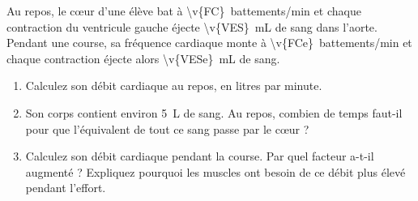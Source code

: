 Au repos, le cœur d'une élève bat à \qty{\v{FC}}{battements/min} et chaque contraction du ventricule gauche éjecte \qty{\v{VES}}{mL} de sang dans l'aorte. Pendant une course, sa fréquence cardiaque monte à \qty{\v{FCe}}{battements/min} et chaque contraction éjecte alors \qty{\v{VESe}}{mL} de sang.

\begin{enumerate}[label=\alph*)]
    \item Calculez son débit cardiaque au repos, en litres par minute.
    \item Son corps contient environ \qty{5}{L} de sang. Au repos, combien de temps faut-il pour que l'équivalent de tout ce sang passe par le cœur ?
    \item Calculez son débit cardiaque pendant la course. Par quel facteur a-t-il augmenté ? Expliquez pourquoi les muscles ont besoin de ce débit plus élevé pendant l'effort.
\end{enumerate}
